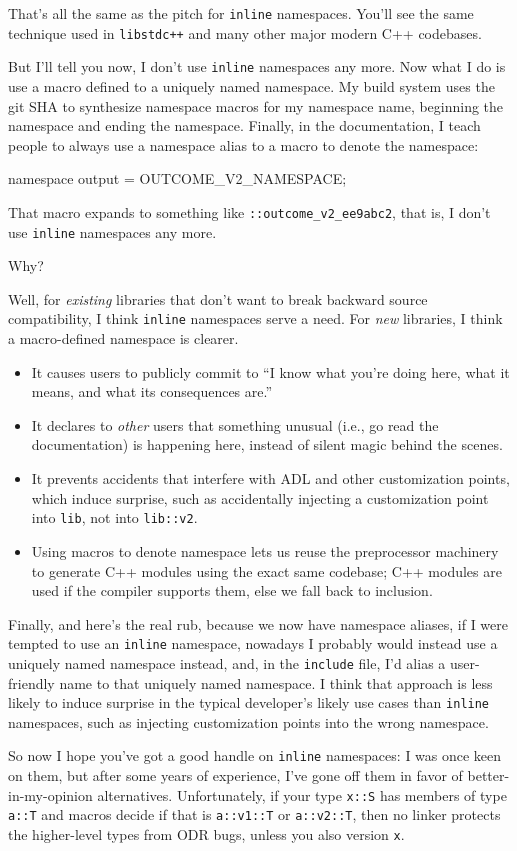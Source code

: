 That's all the same as the pitch for \lstinline!inline! namespaces. You'll
see the same technique used in \lstinline!libstdc++! and many other major modern C++
codebases.

But I'll tell you now, I don't use \lstinline!inline! namespaces any more.
Now what I do is use a macro defined to a uniquely named namespace. My
build system uses the git SHA to synthesize namespace macros for my
namespace name, beginning the namespace and ending the namespace.
Finally, in the documentation, I teach people to always use a namespace
alias to a macro to denote the namespace:

\begin{emcppslisting}
namespace output = OUTCOME_V2_NAMESPACE;
\end{emcppslisting} 

\noindent That macro expands to something like \lstinline!::outcome_v2_ee9abc2!,
that is, I don't use \lstinline!inline! namespaces any more.

Why?

Well, for \emph{existing} libraries that don't want to break backward
source compatibility, I think \lstinline!inline! namespaces serve a need.
For \emph{new} libraries, I think a macro-defined namespace is clearer.
\begin{itemize}
\item{It causes users to publicly commit to ``I know what you’re doing here, what it means, and what its consequences are.''}
\item{It declares to \emph{other} users that something unusual (i.e., go read the documentation) is happening here, instead of silent magic behind the scenes.}
\item{It prevents accidents that interfere with ADL and other customization points, which induce surprise, such as accidentally injecting a customization point into \lstinline!lib!, not into \lstinline!lib::v2!.}
\item{Using macros to denote namespace lets us reuse the preprocessor machinery to generate C++ modules using the exact same codebase; C++ modules are used if the compiler supports them, else we fall back to inclusion.}
\end{itemize}

Finally, and here's the real rub, because we now have namespace aliases,
if I were tempted to use an \lstinline!inline! namespace, nowadays I probably would
instead use a uniquely named namespace instead, and, in the \lstinline!include! file,
I'd alias a user-friendly name to that uniquely named namespace. I think
that approach is less likely to induce surprise in the typical
developer's likely use cases than \lstinline!inline! namespaces, such as
injecting customization points into the wrong namespace.

So now I hope you've got a good handle on \lstinline!inline! namespaces: I
was once keen on them, but after some years of experience, I've gone off
them in favor of better-in-my-opinion alternatives. Unfortunately, if your type \lstinline!x::S! has members of type
\lstinline!a::T! and macros decide if that is \lstinline!a::v1::T! or
\lstinline!a::v2::T!, then no linker protects the higher-level types from
ODR bugs, unless you also version \lstinline!x!.


